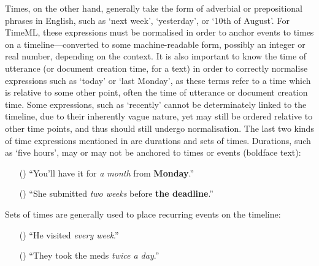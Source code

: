 \documentclass[a4paper,12pt,leqno,twoside]{article}
\newcommand{\ipp}{(\refstepcounter{equation}\theequation)}
\begin{document}
Times, on the other hand, generally take the form of adverbial or prepositional phrases in English, such as `next week', `yesterday', or `10th of August'. For TimeML, these expressions must be normalised in order to anchor events to times on a timeline---converted to some machine-readable form, possibly an integer or real number, depending on the context. It is also important to know the time of utterance (or document creation time, for a text) in order to correctly normalise expressions such as `today' or `last Monday', as these terms refer to a time which is relative to some other point, often the time of utterance or document creation time. Some expressions, such as `recently' cannot be determinately linked to the timeline, due to their inherently vague nature, yet may still be ordered relative to other time points, and thus should still undergo normalisation. The last two kinds of time expressions mentioned in \citet{Pustejovsky2005} are durations and sets of times. Durations, such as `five hours', may or may not be anchored to times or events (boldface text):
\begin{itemize}
	\item[\ipp] ``You'll have it for \textit{a month} from \textbf{Monday}.''
	\item[\ipp] ``She submitted \textit{two weeks} before \textbf{the deadline}.''
\end{itemize}
Sets of times are generally used to place recurring events on the timeline:
\begin{itemize}
	\item[\ipp] ``He visited \textit{every week}.''
	\item[\ipp] ``They took the meds \textit{twice a day}.''
\end{itemize}
% 
% 
\end{document}
